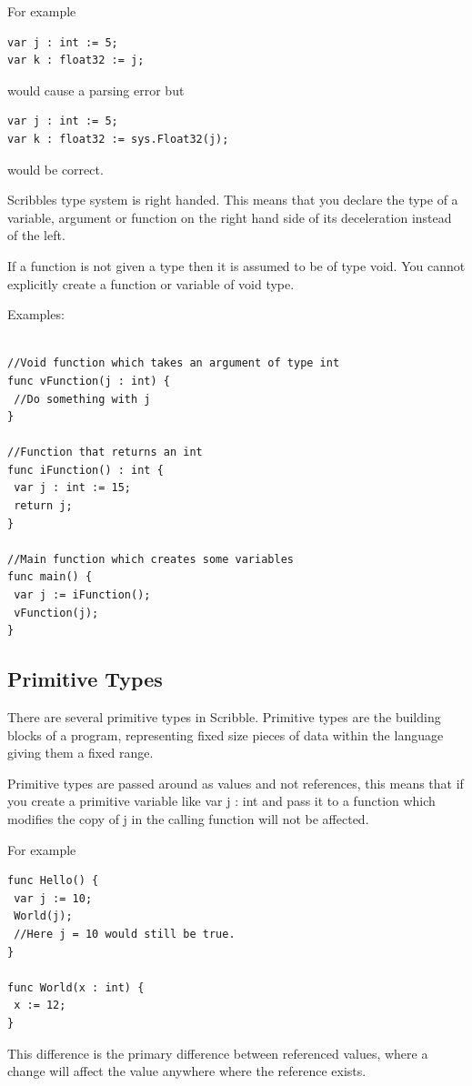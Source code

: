 \documentclass[]{final_report}
\begin{document}
For example
\begin{verbatim}
var j : int := 5;
var k : float32 := j;
\end{verbatim}
would cause a parsing error but
\begin{verbatim}
var j : int := 5;
var k : float32 := sys.Float32(j);
\end{verbatim}
would be correct.


Scribbles type system is right handed. This means that you declare the type of a variable, argument or function on the right hand side of its deceleration instead of the left.

If a function is not given a type then it is assumed to be of type void. You cannot explicitly create a function or variable of void type.

Examples:
\begin{verbatim}

//Void function which takes an argument of type int
func vFunction(j : int) {
 //Do something with j
}

//Function that returns an int
func iFunction() : int {
 var j : int := 15;
 return j;
}

//Main function which creates some variables
func main() {
 var j := iFunction();
 vFunction(j);
}
\end{verbatim}

\subsection{Primitive Types}

There are several primitive types in Scribble. Primitive types are the building blocks of a program, representing fixed size pieces of data within the language giving them a fixed range.

Primitive types are passed around as values and not references, this means that if you create a primitive variable like var j : int and pass it to a function which modifies the copy of j in the calling function will not be affected.

For example \begin{verbatim}
func Hello() {
 var j := 10;
 World(j);
 //Here j = 10 would still be true.
}

func World(x : int) {
 x := 12;
}
\end{verbatim}

This difference is the primary difference between referenced values, where a change will affect the value anywhere where the reference exists.
\end{document}

